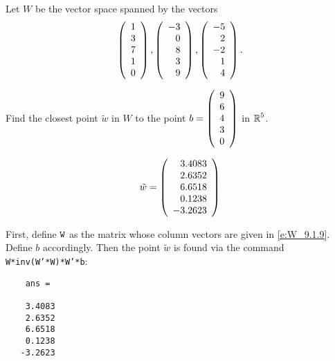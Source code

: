 \documentclass{ximera}
\begin{document}
\begin{computerExercise}  \label{YZ_9.1.9}
Let $W$ be the vector space spanned by the vectors 
\begin{equation} \label{e:W_9.1.9}
\left(\begin{array}{rrrrrrrrrrrrrrrrrr} 1 \\3\\7\\1\\0 \end{array}\right),\left(\begin{array}{rrrrrrrrrrrrrrrrrr} -3 \\0\\8\\3\\9 \end{array}\right),\left(\begin{array}{rrrrrrrrrrrrrrrrrr} -5 \\2\\-2\\1\\4 \end{array}\right).
\end{equation}

Find the closest point $\tilde{w}$ in $W$ to the point $b=\left(\begin{array}{rrrrrrrrrrrrrrrrrr} 9\\6\\4\\3\\0 \end{array}\right)$ in $\mbox{$\mathbb{R}$}^5$.

\begin{solution}

\ans
\[
\tilde{w}=\left(\begin{array}{rrrrrrrrrrrrrrrrrr}  3.4083\\
    2.6352\\
    6.6518\\
    0.1238\\
   -3.2623 \end{array}\right)
\]

\soln First, define $\tt W$ as the matrix whose column vectors are given in \eqref{e:W_9.1.9}. Define $b$ accordingly. Then the point $\tilde{w}$ is found via
the command {\tt W*inv(W'*W)*W'*b}:
\begin{verbatim}
    ans =

    3.4083
    2.6352
    6.6518
    0.1238
   -3.2623

\end{verbatim}
\end{solution}
\end{computerExercise}
\end{document}
